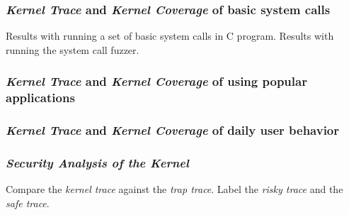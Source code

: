 \subsubsection{\textit{Kernel Trace} and \textit{Kernel Coverage} of basic system calls}
Results with running a set of basic system calls in C program. Results with running the system call fuzzer. 

\subsubsection{\textit{Kernel Trace} and \textit{Kernel Coverage} of using popular applications}

\subsubsection{\textit{Kernel Trace} and \textit{Kernel Coverage} of daily user behavior}

\subsubsection{\textit{Security Analysis of the Kernel}}
Compare the \textit{kernel trace} against the \textit{trap trace}.
Label the \textit{risky trace} and the \textit{safe trace}.